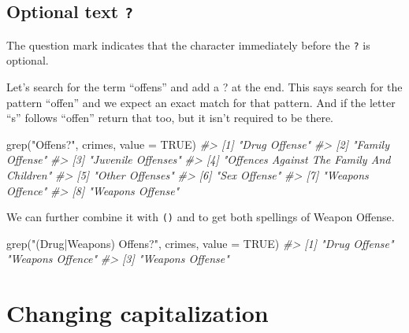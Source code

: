 \documentclass[
  12pt,
  openany]{book}
\newenvironment{Shaded}{\begin{snugshade}}{\end{snugshade}}
\newcommand{\AttributeTok}[1]{\textcolor[rgb]{0.61,0.61,0.61}{#1}}
\newcommand{\CommentTok}[1]{\textcolor[rgb]{0.37,0.37,0.37}{\textit{#1}}}
\newcommand{\ConstantTok}[1]{\textcolor[rgb]{0,0,0}{#1}}
\newcommand{\FunctionTok}[1]{\textcolor[rgb]{0,0,0}{#1}}
\newcommand{\NormalTok}[1]{#1}
\newcommand{\StringTok}[1]{\textcolor[rgb]{0.5,0.5,0.5}{#1}}
\begin{document}
\hypertarget{optional-text}{%
\subsection{\texorpdfstring{Optional text \texttt{?}}{Optional text ?}}\label{optional-text}}

The question mark indicates that the character immediately before the \texttt{?} is optional.

Let's search for the term ``offens'' and add a ? at the end. This says search for the pattern ``offen'' and we expect an exact match for that pattern. And if the letter ``s'' follows ``offen'' return that too, but it isn't required to be there.

\begin{Shaded}
\begin{Highlighting}[]
\FunctionTok{grep}\NormalTok{(}\StringTok{"Offens?"}\NormalTok{, crimes, }\AttributeTok{value =} \ConstantTok{TRUE}\NormalTok{)}
\CommentTok{\#\textgreater{} [1] "Drug Offense"                            }
\CommentTok{\#\textgreater{} [2] "Family Offense"                          }
\CommentTok{\#\textgreater{} [3] "Juvenile Offenses"                       }
\CommentTok{\#\textgreater{} [4] "Offences Against The Family And Children"}
\CommentTok{\#\textgreater{} [5] "Other Offenses"                          }
\CommentTok{\#\textgreater{} [6] "Sex Offense"                             }
\CommentTok{\#\textgreater{} [7] "Weapons Offence"                         }
\CommentTok{\#\textgreater{} [8] "Weapons Offense"}
\end{Highlighting}
\end{Shaded}

We can further combine it with \texttt{()} and \texttt{\textbar{}} to get both spellings of Weapon Offense.

\begin{Shaded}
\begin{Highlighting}[]
\FunctionTok{grep}\NormalTok{(}\StringTok{"(Drug|Weapons) Offens?"}\NormalTok{, crimes, }\AttributeTok{value =} \ConstantTok{TRUE}\NormalTok{)}
\CommentTok{\#\textgreater{} [1] "Drug Offense"    "Weapons Offence"}
\CommentTok{\#\textgreater{} [3] "Weapons Offense"}
\end{Highlighting}
\end{Shaded}

\hypertarget{changing-capitalization}{%
\section{Changing capitalization}\label{changing-capitalization}}
\end{document}
